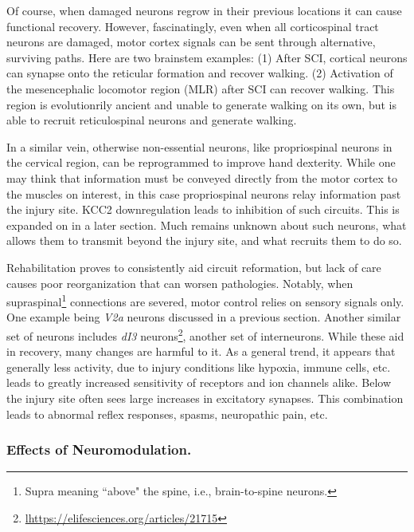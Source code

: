\documentclass[12pt]{report}
\begin{document}
Of course, when damaged neurons regrow in their previous locations it can cause functional recovery. However, fascinatingly, even when all corticospinal tract neurons are damaged, motor cortex signals can be sent through alternative, surviving paths. Here are two brainstem examples: (1) After SCI, cortical neurons can synapse onto the reticular formation and recover walking. (2) Activation of the mesencephalic locomotor region (MLR) after SCI can recover walking. This region is evolutionrily ancient and unable to generate walking on its own, but is able to recruit reticulospinal neurons and generate walking.\newline

In a similar vein, otherwise non-essential neurons, like propriospinal neurons in the cervical region, can be reprogrammed to improve hand dexterity. While one may think that information must be conveyed directly from the motor cortex to the muscles on interest, in this case propriospinal neurons relay information past the injury site. KCC2 downregulation leads to inhibition of such circuits. This is expanded on in a later section. Much remains unknown about such neurons, what allows them to transmit beyond the injury site, and what recruits them to do so.\newline

Rehabilitation proves to consistently aid circuit reformation, but lack of care causes poor reorganization that can worsen pathologies. Notably, when supraspinal\footnote{Supra meaning ``above" the spine, i.e., brain-to-spine neurons.} connections are severed, motor control relies on sensory signals only. One example being \textit{V2a} neurons discussed in a previous section. Another similar set of neurons includes \textit{dI3} neurons\footnote{\url{lhttps://elifesciences.org/articles/21715}}, another set of interneurons. While these aid in recovery, many changes are harmful to it. As a general trend, it appears that generally less activity, due to injury conditions like hypoxia, immune cells, etc. leads to greatly increased sensitivity of receptors and ion channels alike. Below the injury site often sees large increases in excitatory synapses. This combination leads to abnormal reflex responses, spasms, neuropathic pain, etc. 

\subsubsection{Effects of Neuromodulation.}
\end{document}
